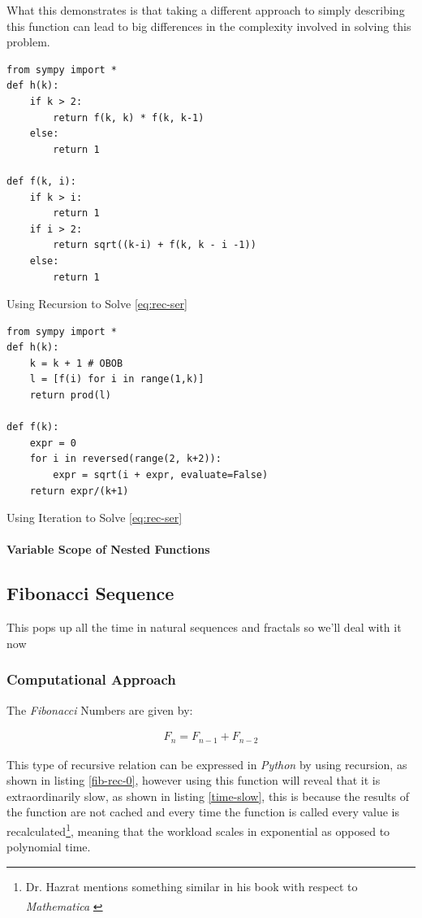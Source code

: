 \documentclass[11pt]{article}
\begin{document}
What this demonstrates is that taking a different approach to simply describing
this function can lead to big differences in the complexity involved in solving
this problem.

\begin{listing}[htbp]
\begin{verbatim}
from sympy import *
def h(k):
    if k > 2:
        return f(k, k) * f(k, k-1)
    else:
        return 1

def f(k, i):
    if k > i:
        return 1
    if i > 2:
        return sqrt((k-i) + f(k, k - i -1))
    else:
        return 1
\end{verbatim}
\caption{\label{rec-two}Using Recursion to Solve \eqref{eq:rec-ser}}
\end{listing}


\begin{listing}[htbp]
\begin{verbatim}
from sympy import *
def h(k):
    k = k + 1 # OBOB
    l = [f(i) for i in range(1,k)]
    return prod(l)

def f(k):
    expr = 0
    for i in reversed(range(2, k+2)):
        expr = sqrt(i + expr, evaluate=False)
    return expr/(k+1)
\end{verbatim}
\caption{\label{iter-two}Using Iteration to Solve \eqref{eq:rec-ser}}
\end{listing}

\paragraph{Variable Scope of Nested Functions}
\label{variable-scope-nested}

\subsection{Fibonacci Sequence}
\label{sec:org1cb36ef}
This pops up all the time in natural sequences and fractals so we'll deal with it now
\subsubsection{Computational Approach}
\label{define-the-fibonacci-numbers}
The \emph{Fibonacci} Numbers are given by:

\begin{align}
F_n = F_{n-1} + F_{n-2} \label{eq:fib-def}
\end{align}

This type of recursive relation can be expressed in \emph{Python} by using recursion,
as shown in listing \ref{fib-rec-0}, however using this function will reveal that it
is extraordinarily slow, as shown in listing \ref{time-slow}, this is because the
results of the function are not cached and every time the function is called
every value is recalculated\footnote{Dr. Hazrat mentions something similar in his book with respect to
\emph{Mathematica}\textsuperscript{\textregistered}
\cite[Ch. 13]{hazratMathematicaProblemCenteredApproach2015}}, meaning that the workload scales in
exponential as opposed to polynomial time.
\end{document}
